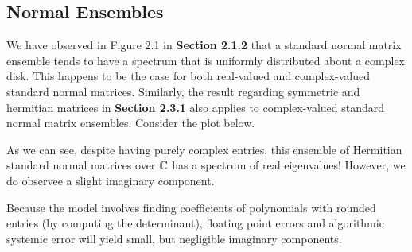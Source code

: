 \subsection{Normal Ensembles}

%


We have observed in Figure 2.1 in \textbf{Section 2.1.2} that a standard normal matrix ensemble tends to have a spectrum that is uniformly distributed about a complex disk. This happens to be the case for both real-valued and complex-valued standard normal matrices. Similarly, the result regarding symmetric and hermitian matrices in \textbf{Section 2.3.1} also applies to complex-valued standard normal matrix ensembles. Consider the plot below.


As we can see, despite having purely complex entries, this ensemble of Hermitian standard normal matrices over $\mathbb{C}$ has a spectrum of real eigenvalues!
However, we do observee a slight imaginary component.

\begin{remark}
Because the model involves finding coefficients of polynomials with rounded entries (by computing the determinant),
floating point errors and algorithmic systemic error will yield small, but negligible imaginary components.
\end{remark}
